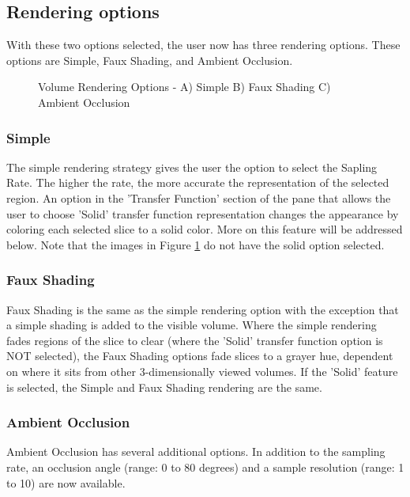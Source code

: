 \documentclass[fleqn,11pt,openany]{book}
\begin{document}
\subsection{Rendering options}

With these two options selected, the user now has three rendering options.
These options are Simple, Faux Shading, and Ambient Occlusion.

\begin{figure}[h!]
\caption{Volume Rendering Options - A) Simple B) Faux Shading C) Ambient Occlusion}\label{fig:VolRendOpt}
\end{figure}

\subsubsection{Simple}
The simple rendering strategy gives the user the option to select the Sapling Rate.
The higher the rate, the more accurate the representation of the selected region.
An option in the 'Transfer Function' section of the pane that allows the user to choose 'Solid' transfer function representation changes the appearance by coloring each selected slice to a solid color.
More on this feature will be addressed below.
Note that the images in Figure \ref{fig:VolRendOpt} do not have the solid option selected.

\subsubsection{Faux Shading}
Faux Shading is the same as the simple rendering option with the exception that a simple shading is added to the visible volume.
Where the simple rendering fades regions of the slice to clear (where the 'Solid' transfer function option is NOT selected), the Faux Shading options fade slices to a grayer hue, dependent on where it sits from other 3-dimensionally viewed volumes.
If the 'Solid' feature is selected, the Simple and Faux Shading rendering are the same.

\subsubsection{Ambient Occlusion}
Ambient Occlusion has several additional options.
In addition to the sampling rate, an occlusion angle (range: 0 to 80 degrees) and a sample resolution (range: 1 to 10) are now available.
\end{document}
